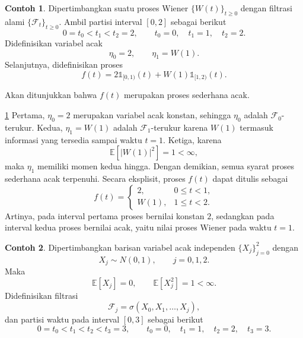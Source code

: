 \documentclass[aspectratio=169,11pt]{beamer}
\theoremstyle{definition}
\newtheorem{contoh}{Contoh}
\newcommand{\myref}[1]{\hyperref[#1]{\nameCref{#1} \ref*{#1}}}
\begin{document}
\begin{frame}{\insertsection}{\insertsubsection}
  \begin{contoh}\label{cth:5.1}
    Dipertimbangkan suatu proses Wiener $\{W(t)\}_{t\geq 0}$ dengan filtrasi alami
    $\{\mathcal{F}_t\}_{t\geq 0}$. Ambil partisi interval $[0,2]$ sebagai berikut
    \[
      0=t_0<t_1<t_2=2,
      \qquad
      t_0=0,\quad t_1=1,\quad t_2=2.
    \]
    Didefinisikan variabel acak
    \[
      \eta_0=2,
      \qquad
      \eta_1=W(1).
    \]
    Selanjutnya, didefinisikan proses
    \[
      f(t)=2\mathds{1}_{[0,1)}(t)+W(1)\mathds{1}_{[1,2)}(t).
    \]

    Akan ditunjukkan bahwa $f(t)$ merupakan proses sederhana acak.
  \end{contoh}
\end{frame}

\begin{frame}{\insertsection}{\insertsubsection}
  \begin{exampleblock}{\myref{cth:5.1}}
    Pertama,
    $\eta_0=2$ merupakan variabel acak konstan, sehingga $\eta_0$ adalah
    $\mathcal{F}_{0}$-terukur. Kedua, $\eta_1=W(1)$ adalah
    $\mathcal{F}_{1}$-terukur karena $W(1)$ termasuk informasi yang tersedia sampai
    waktu $t=1$. Ketiga, karena
    \[
      \mathbb{E}\left[|W(1)|^2\right]=1<\infty,
    \]
    maka $\eta_1$ memiliki momen kedua hingga. Dengan demikian, semua syarat proses
    sederhana acak terpenuhi.
    Secara eksplisit, proses $f(t)$ dapat ditulis sebagai
    \[
      f(t)=
      \begin{cases}
        2,    & 0\leq t<1, \\
        W(1), & 1\leq t<2.
      \end{cases}
    \]
    Artinya, pada interval pertama proses bernilai konstan $2$, sedangkan pada
    interval kedua proses bernilai acak, yaitu nilai proses Wiener pada waktu
    $t=1$.
  \end{exampleblock}
\end{frame}

\begin{frame}{\insertsection}{\insertsubsection}
  \begin{contoh}\label{cth:5.2}
    Dipertimbangkan barisan variabel acak independen
    $\{X_j\}_{j=0}^{2}$ dengan
    \[
      X_j\sim N(0,1),
      \qquad j=0,1,2.
    \]
    Maka
    \[
      \mathbb{E}[X_j]=0,
      \qquad
      \mathbb{E}[X_j^2]=1<\infty.
    \]
    Didefinisikan filtrasi
    \[
      \mathcal{F}_j=\sigma(X_0,X_1,\ldots,X_j),
    \]
    dan partisi waktu pada interval $[0,3]$ sebagai berikut
    \[
      0=t_0<t_1<t_2<t_3=3,
      \qquad
      t_0=0,\quad t_1=1,\quad t_2=2,\quad t_3=3.
    \]
  \end{contoh}
\end{frame}
\end{document}

